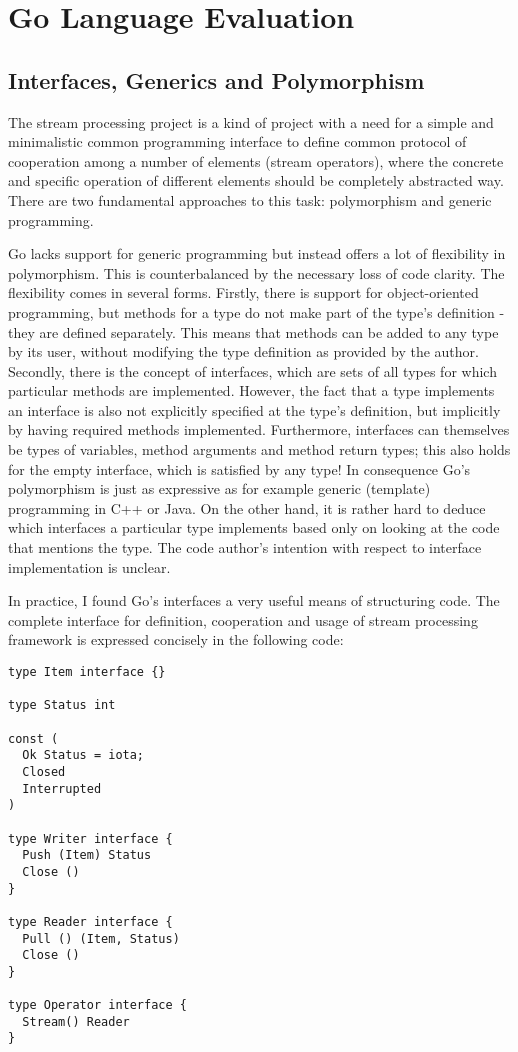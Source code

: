 \documentclass {article}
\begin{document}
\section{Go Language Evaluation}
\label{sec:language}

\subsection {Interfaces, Generics and Polymorphism}

The stream processing project is a kind of project with a need for a simple and minimalistic common programming interface to define common protocol of cooperation among a number of elements (stream operators), where the concrete and specific operation of different elements should be completely abstracted way. There are two fundamental approaches to this task: polymorphism and generic programming.

Go lacks support for generic programming but instead offers a lot of flexibility in polymorphism. This is counterbalanced by the necessary loss of code clarity. The flexibility comes in several forms. Firstly, there is support for object-oriented programming, but methods for a type do not make part of the type's definition - they are defined separately. This means that methods can be added to any type by its user, without modifying the type definition as provided by the author. Secondly, there is the concept of interfaces, which are sets of all types for which particular methods are implemented. However, the fact that a type implements an interface is also not explicitly specified at the type's definition, but implicitly by having required methods implemented. Furthermore, interfaces can themselves be types of variables, method arguments and method return types; this also holds for the empty interface, which is satisfied by any type! In consequence Go's polymorphism is just as expressive as for example generic (template) programming in C++ or Java. On the other hand, it is rather hard to deduce which interfaces a particular type implements based only on looking at the code that mentions the type. The code author's intention with respect to interface implementation is unclear.

In practice, I found Go's interfaces a very useful means of structuring code. The complete interface for definition, cooperation and usage of stream processing framework is expressed concisely in the following code:

\begin{lstlisting}
type Item interface {}

type Status int

const (
  Ok Status = iota;
  Closed
  Interrupted
)

type Writer interface {
  Push (Item) Status
  Close ()
}

type Reader interface {
  Pull () (Item, Status)
  Close ()
}

type Operator interface {
  Stream() Reader
}
\end{lstlisting}
\end{document}
